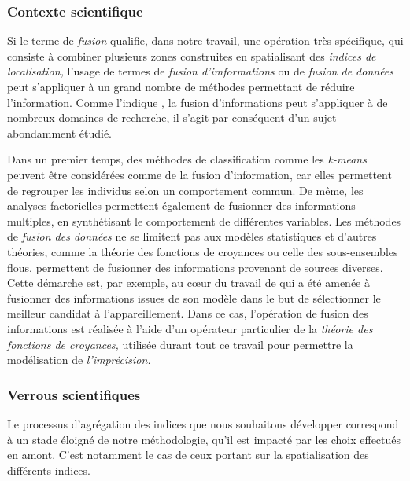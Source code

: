 \subsubsection{Contexte scientifique}

Si le terme de \emph{fusion} qualifie, dans notre travail, une
opération très spécifique, qui consiste à combiner plusieurs zones
construites en spatialisant des \emph{indices de localisation,}
l'usage de termes de \emph{fusion d'imformations} ou de \emph{fusion
  de données} peut s'appliquer à un grand nombre de méthodes
permettant de réduire l'information. Comme l'indique
\textcite{Castanedo2013}, la fusion d'informations peut s'appliquer à
de nombreux domaines de recherche, il s'agit par conséquent d'un sujet
abondamment étudié.

Dans un premier temps, des méthodes de classification comme les
\emph{k-means} peuvent être considérées comme de la fusion
d’information, car elles permettent de regrouper les individus selon
un comportement commun. De même, les analyses factorielles permettent
également de fusionner des informations multiples, en synthétisant le
comportement de différentes variables. Les méthodes de \emph{fusion
  des données} ne se limitent pas aux modèles statistiques et d'autres
théories, comme la théorie des fonctions de croyances ou celle des
sous-ensembles flous, permettent de fusionner des informations
provenant de sources diverses. Cette démarche est, par exemple, au
cœur du travail de \textcite{Olteanu-Raimond2008} qui a été amenée à
fusionner des informations issues de son modèle dans le but de
sélectionner le meilleur candidat à l'appareillement. Dans ce cas,
l'opération de fusion des informations est réalisée à l'aide d'un
opérateur particulier de la \emph{théorie des fonctions de croyances,}
utilisée durant tout ce travail pour permettre la modélisation de
\emph{l'imprécision.}

\subsubsection{Verrous scientifiques}

Le processus d'agrégation des indices que nous souhaitons développer
correspond à un stade éloigné de notre méthodologie, \ie qu'il est
impacté par les choix effectués en amont. C'est notamment le cas de
ceux portant sur la spatialisation des différents indices.

